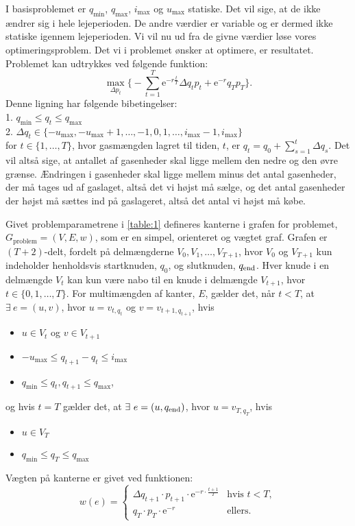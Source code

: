 I basisproblemet er $q_{\min}$, $q_{\max}$, $i_{\max}$ og $u_{\max}$ statiske. Det vil sige, at de ikke ændrer sig i hele lejeperioden. De andre værdier er variable og er dermed ikke statiske igennem lejeperioden. Vi vil nu ud fra de givne værdier løse vores optimeringsproblem. Det vi i problemet ønsker at optimere, er resultatet. Problemet kan udtrykkes ved følgende funktion:
\begin{equation}
\max_{\Delta p_{t}} \Bigg\{ -\sum_{t=1}^{T} \mathrm{e}^{-r\frac{t}{T}} \Delta q_{t} p_{t}+ \mathrm{e}^{-r}q_{T}p_{T} \Bigg\}.
\end{equation}
Denne ligning har følgende bibetingelser:\\
1. $q_{\min} \leq q_{t} \leq q_{\max}$\\
2. $\Delta q_{t} \in \{-u_{\max},-u_{\max}+1,\dotsc,-1,0,1,\dotsc,i_{\max}-1,i_{\max} \}$ \\
for $t \in \{1,\dotsc,T\}$, hvor gasmængden lagret til tiden, $t$, er $q_{t}=q_{0}+\sum_{s=1}^{t} \Delta q_{s}$.
Det vil altså sige, at antallet af gasenheder skal ligge mellem den nedre og den øvre grænse. Ændringen i gasenheder skal ligge mellem minus det antal gasenheder, der må tages ud af gaslaget, altså det vi højst må sælge, og det antal gasenheder der højst må sættes ind på gaslageret, altså det antal vi højst må købe.


\begin{defn}
Givet problemparametrene i \autoref{table:1} defineres kanterne i grafen for problemet, $G_{\textrm{problem}}=(V,E,w)$, som er en simpel, orienteret og vægtet graf. Grafen er $(T+2)$-delt, fordelt på delmængderne $V_0,V_1, \dotsc, V_{T+1}$, hvor $V_0$ og $V_{T+1}$ kun indeholder henholdsvis startknuden, $q_0$, og slutknuden, $q_{\textrm{end}}$. Hver knude i en delmængde $V_t$ kan kun være nabo til en knude i delmængde $V_{t+1}$, hvor $t \in \{0,1, \dotsc,T\}$.
For multimængden af kanter, $E$, gælder det, når $t<T$, at $\exists \ e = (u,v)$, hvor $u=v_{t,q_t}$ og $v=v_{t+1, q_{t+1}}$, hvis
	\begin{itemize}
	\item $u \in V_t$ og $v \in V_{t+1}$
	\item $-u_{\max} \leq q_{t+1}-q_t \leq i_{\max}$
	\item $q_{\min} \leq q_t, q_{t+1} \leq q_{\max}$,
	\end{itemize}
og hvis $t=T$ gælder det, at $\exists \ e=(u,q_{\slut})$, hvor $u=v_{T,q_T}$, hvis
	\begin{itemize}
	\item $u \in V_T$
	\item $q_{\min} \leq q_{T} \leq q_{\max}$
	\end{itemize}
Vægten på kanterne er givet ved funktionen:
\begin{equation}
w(e)=
	\begin{cases}
	\Delta q_{t+1} \cdot p_{t+1} \cdot \textrm{e}^{-r \cdot \frac{t+1}{T}} &\text{hvis } t < T, \\
	q_T \cdot p_T \cdot \textrm{e}^{-r} & \text{ellers.}
	\end{cases}
\end{equation}

\end{defn}
